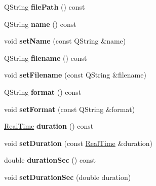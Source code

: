 \begin{DoxyCompactItemize}
Q\+String {\bfseries file\+Path} () const
\item 
\mbox{\label{class_corpus_recording_a777e53057b4efeb5f193762519da9587}} 
Q\+String {\bfseries name} () const
\item 
\mbox{\label{class_corpus_recording_a67037b91f6f3c4b3b0364bc018c4a2a5}} 
void {\bfseries set\+Name} (const Q\+String \&name)
\item 
\mbox{\label{class_corpus_recording_a4c569c78ba233dc501edd3b791805c5e}} 
Q\+String {\bfseries filename} () const
\item 
\mbox{\label{class_corpus_recording_aa626693ea446a6d7a7f9534165e852e0}} 
void {\bfseries set\+Filename} (const Q\+String \&filename)
\item 
\mbox{\label{class_corpus_recording_aa05f360593b3ea17024750a720cb3785}} 
Q\+String {\bfseries format} () const
\item 
\mbox{\label{class_corpus_recording_a875f5a696ef8e90f3772010f584f58f2}} 
void {\bfseries set\+Format} (const Q\+String \&format)
\item 
\mbox{\label{class_corpus_recording_acab3d304e1da2ad678def1a19bb33da1}} 
\hyperlink{struct_real_time}{Real\+Time} {\bfseries duration} () const
\item 
\mbox{\label{class_corpus_recording_ac5b130acf20352407a2bf21a9ae9df77}} 
void {\bfseries set\+Duration} (const \hyperlink{struct_real_time}{Real\+Time} \&duration)
\item 
\mbox{\label{class_corpus_recording_a843221a0ccdc2960b4fc9e6c22cae7fd}} 
double {\bfseries duration\+Sec} () const
\item 
\mbox{\label{class_corpus_recording_a9d7f07e7da9878b09dec5ed8a6bd5de9}} 
void {\bfseries set\+Duration\+Sec} (double duration)
\item 
\mbox{\label{class_corpus_recording_a3a5adeef9c4207f6d361a05ccf422954}} 

\end{DoxyCompactItemize}
